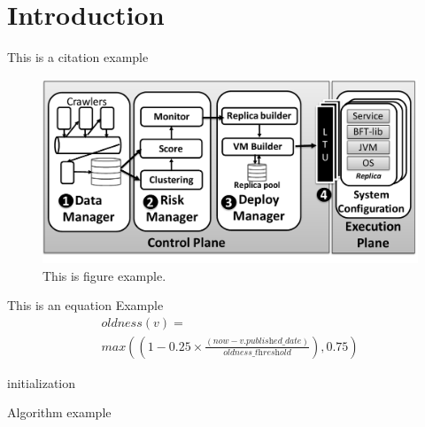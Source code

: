 \chapter{Introduction}
\label{chap:introduction}
\lipsum[1-3]


This is a citation example~\cite{Garcia:2018}


\begin{figure}[!t]
\begin{center}
\includegraphics[width=\columnwidth]{images/figure_example.pdf}
\caption{This is figure example.}
\label{fig:overview}
\end{center}
\end{figure}



This is an equation Example
\begin{equation} 
\begin{split}
\textit{oldness}(v)=\\\textit{max}\left((1-0.25\times\frac{(\textit{now}-v.\textit{published\_date})}{\textit{oldness\_threshold}}), 0.75\right)
\label{eq:oldness}
\end{split}
\end{equation}

\begin{algorithm}[H]
\SetAlgoLined
{}
 initialization\;
 \caption{Algorithm example}
\end{algorithm}



